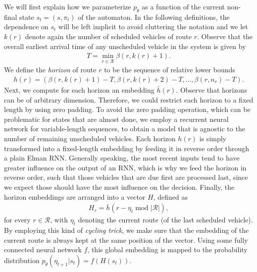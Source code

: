\documentclass[a4paper]{article}
\theoremstyle{definition}
\theoremstyle{plain}
\begin{document}
We will first explain how we parameterize $p_{\theta}$ as a function of the
current non-final state $s_{t} = (s, \pi_{t})$ of the automaton.
%
In the following definitions, the dependence on $s_{t}$ will be left implicit
to avoid cluttering the notation and we let $k(r)$ denote again the number of
scheduled vehicles of route $r$. Observe that the overall earliest arrival time
of any unscheduled vehicle in the system is given by
\begin{align*}
  T = \min_{r \in \mathcal{R}} \beta(r, k(r) + 1) .
\end{align*}
We define the \textit{horizon} of route $r$ to be the sequence of relative lower bounds
\begin{align*}
  h(r) = (\beta(r, k(r) + 1) - T, \beta(r, k(r) + 2) - T, \dots, \beta(r, n_{r}) - T) .
\end{align*}
%
Next, we compute for each horizon an embedding $\bar{h}(r)$.
%
Observe that horizons can be of arbitrary dimension. Therefore, we could
restrict each horizon to a fixed length by using zero padding.
%
To avoid the zero padding operation, which can be problematic for states that
are almost done, we employ a recurrent neural network for variable-length
sequences, to obtain a model that is agnostic to the number of remaining
unscheduled vehicles. Each horizon $h(r)$ is simply transformed into a
fixed-length embedding by feeding it in reverse order through a plain Elman RNN.
Generally speaking, the most recent inputs tend to have greater influence on the
output of an RNN, which is why we feed the horizon in reverse order, such that
those vehicles that are due first are processed last, since we expect those
should have the most influence on the decision.
%
Finally, the horizon embeddings are arranged into a vector $H$, defined as
\begin{align*}
  {H}_{r} = \bar{h}(r - \eta_{t} \; \mathrm{mod} \; |\mathcal{R}|) ,
\end{align*}
for every $r \in \mathcal{R}$, with $\eta_{t}$ denoting the current route (of the
last scheduled vehicle). By employing this kind of \textit{cycling trick}, we make sure
that the embedding of the current route is always kept at the same position of
the vector.
%
Using some fully connected neural network $f$, this global embedding is mapped to
the probability distribution $p_{\theta}(\eta_{t+1} | s_{t}) = f(H(s_{t}))$.
\end{document}
